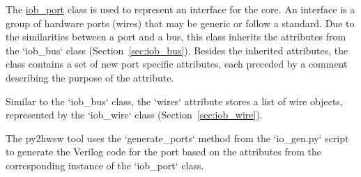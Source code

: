 %

%
%

The \href{https://github.com/IObundle/py2hwsw/blob/main/py2hwsw/scripts/iob_port.py}{iob\_port} class is used to represent an interface for the core.
An interface is a group of hardware ports (wires) that may be generic or follow a standard.
Due to the similarities between a port and a bus, this class inherits the attributes from the `iob\_bus` class (Section~\ref{sec:iob_bus}).
Besides the inherited attributes, the class contains a set of new port specific attributes, each preceded by a comment describing the purpose of the attribute.


Similar to the `iob\_bus` class, the `wires` attribute stores a list of wire objects, represented by the `iob\_wire` class  (Section~\ref{sec:iob_wire}).

%
%

The py2hwsw tool uses the `generate\_ports` method from the `io\_gen.py` script to generate the Verilog code for the port based on the attributes from the corresponding instance of the `iob\_port` class.


